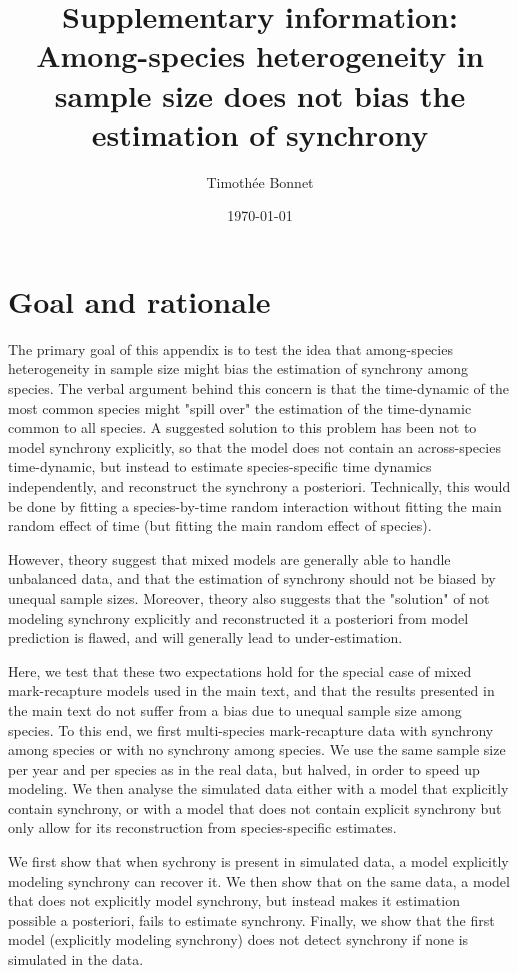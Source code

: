 \documentclass[a4paper, 10pt]{scrartcl}\usepackage[]{graphicx}\usepackage[]{color}
\title{Supplementary information: Among-species heterogeneity in sample size does not bias the estimation of synchrony}
\date{\today}
\author{Timoth\'ee Bonnet}
\begin{document}
\maketitle

\tableofcontents

\clearpage

\section{Goal and rationale}
The primary goal of this appendix is to test the idea that among-species heterogeneity in sample size might bias the estimation of synchrony among species. The verbal argument behind this concern is that the time-dynamic of the most common species might "spill over" the estimation of the time-dynamic common to all species. 
A suggested solution to this problem has been not to model synchrony explicitly, so that the model does not contain an across-species time-dynamic, but instead to estimate species-specific time dynamics independently, and reconstruct the synchrony a posteriori. Technically, this would be done by fitting a species-by-time random interaction without fitting the main random effect of time (but fitting the main random effect of species).

However, theory suggest that mixed models are generally able to handle unbalanced data, and that the estimation of synchrony should not be biased by unequal sample sizes.
Moreover, theory also suggests that the "solution" of not modeling synchrony explicitly and reconstructed it a posteriori from model prediction is flawed, and will generally lead to  under-estimation.

Here, we test that these two expectations hold for the special case of mixed mark-recapture models used in the main text, and that the results presented in the main text do not suffer from a bias due to unequal sample size among species.
To this end, we first multi-species mark-recapture data with synchrony among species or with no synchrony among species. We use the same sample size per year and per species as in the real data, but halved, in order to speed up modeling.  
We then analyse the simulated data either with a model that explicitly contain synchrony, or with a model that does not contain explicit synchrony but only allow for its reconstruction from species-specific estimates.

We first show that when sychrony is present in simulated data, a model explicitly modeling synchrony can recover it. We then show that on the same data, a model that does not explicitly model synchrony, but instead makes it estimation possible a posteriori, fails to estimate synchrony.
Finally, we show that the first model (explicitly modeling synchrony) does not detect synchrony if none is simulated in the data.
\end{document}
